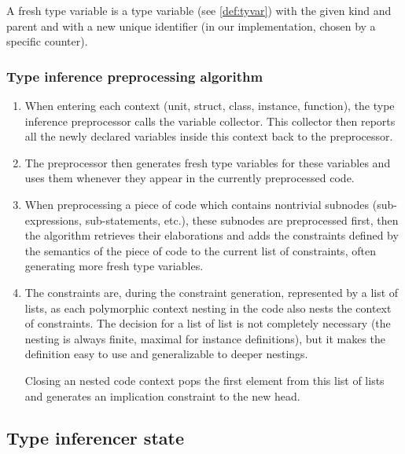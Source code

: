 \begin{defn}
    \label{def:prefresh}
    A fresh type variable is a type variable (see \cref{def:tyvar}) with the given kind and parent and with a new unique identifier (in our implementation, chosen by a specific counter).
\end{defn}

\subsubsection{Type inference preprocessing algorithm}

\begin{enumerate}
    \item When entering each context (unit, struct, class, instance, function), the type inference preprocessor calls the variable collector. This collector then reports all the newly declared variables inside this context back to the preprocessor.

    \item The preprocessor then generates fresh type variables for these variables and uses them whenever they appear in the currently preprocessed code.

    \item When preprocessing a piece of code which contains nontrivial subnodes (sub-expressions, sub-statements, etc.), these subnodes are preprocessed first, then the algorithm retrieves their elaborations and adds the constraints defined by the semantics of the piece of code to the current list of constraints, often generating more fresh type variables.

    \item The constraints are, during the constraint generation, represented by a list of lists, as each polymorphic context nesting in the code also nests the context of constraints. The decision for a list of list is not completely necessary (the nesting is always finite, maximal for instance definitions), but it makes the definition easy to use and generalizable to deeper nestings.

    Closing an nested code context pops the first element from this list of lists and generates an implication constraint to the new head.
\end{enumerate}

\subsection{Type inferencer state}
\label{sec:istate}

